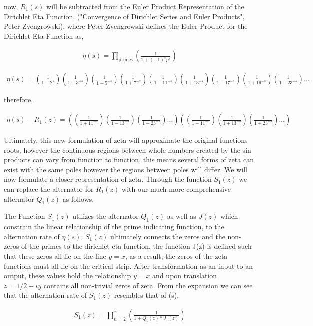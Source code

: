 \documentclass{article}
\begin{document}
now, $R_1(s)$ will be subtracted from the Euler Product Representation of the Dirichlet Eta Function, ("Convergence of Dirichlet Series and Euler Products", Peter Zvengrowski), where Peter Zvengrowski defines the Euler Product for the Dirichlet Eta Function as,

\begin{align*}
\eta(s) = \prod_{\text{primes}} \left( \frac{1}{1+(-1)^{s}p^{s}} \right)
\end{align*}

\begin{align*}
\eta(s) = (\frac{1}{1 - 2^{s}})(\frac{1}{1 + 3^{-s}})(\frac{1}{1 - 5^{-s}})(\frac{1}{1 + 7^{-s}})(\frac{1}{1 - 11^{-s}})(\frac{1}{1 + 13^{-s}})(\frac{1}{1 - 17^{-s}})(\frac{1}{1 + 19^{-s}})(\frac{1}{1 - 23^{-s}}) \ldots
\end{align*}

therefore,

\begin{align*}
\eta(s) - R_1(z) =((\frac{1}{1 + 11^{-s}})(\frac{1}{1 - 13^{-s}})(\frac{1}{1 - 23^{-s}}) \ldots)((\frac{1}{1 - 11^{-s}})(\frac{1}{1 + 13^{-s}})(\frac{1}{1 + 23^{-s}}) \ldots)
\end{align*}

Ultimately, this new formulation of zeta will approximate the original functions roots, however the continuous regions between whole numbers created by the sin products can vary from function to function, this means several forms of zeta can exist with the same poles however the regions between poles will differ. We will now formulate a closer representation of zeta. Through the function $S_1(z)$ we can replace the alternator for $R_1(z)$ with our much more comprehensive alternator $Q_1(z)$ as follows.

\newpage
The Function $S_1(z)$ utilizes the alternator $Q_1(z)$ as well as $J(z)$ which constrain the linear relationship of the prime indicating function, to the alternation rate of $\eta(s)$. $S_1(z)$ ultimately connects the zeros and the non-zeros of the primes to the dirichlet eta function, the function J(z) is defined such that these zeros all lie on the line $y = x$, as a result, the zeros of the zeta functions must all lie on the critical strip. After transformation as an input to an output, these values hold the relationship $y=x$ and upon translation $z = 1/2 + iy$ contains all non-trivial zeros of zeta. From the expansion we can see that the alternation rate of $S_1(z)$ resembles that of \eta(s),

\begin{align*}
S_1(z) = \prod_{n=2}^x \left( \frac{1}{1 + Q_1(z) * J_1(z)} \right)
\end{align*}
\end{document}
